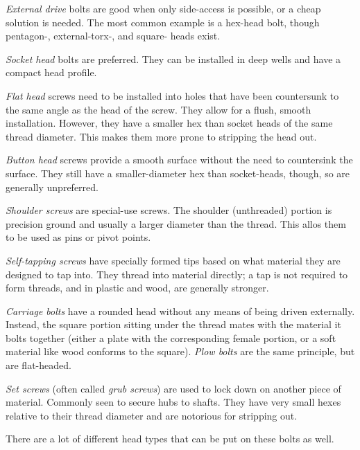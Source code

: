 \documentclass[10pt,letterpaper]{book}
\begin{document}
	\begin{asparaenum}[a)]
		\item \textit{External drive} bolts are good when only side-access is possible, or a cheap solution is needed. The most common example is a hex-head bolt, though pentagon-, external-torx-, and square- heads exist.
		\item \textit{Socket head} bolts are preferred. They can be installed in deep wells and have a compact head profile.
		\item \textit{Flat head} screws need to be installed into holes that have been countersunk to the same angle as the head of the screw. They allow for a flush, smooth installation. However, they have a smaller hex than socket heads of the same thread diameter. This makes them more prone to stripping the head out.
		\item \textit{Button head} screws provide a smooth surface without the need to countersink the surface. They still have a smaller-diameter hex than socket-heads, though, so are generally unpreferred.
		\item \textit{Shoulder screws} are special-use screws. The shoulder (unthreaded) portion is precision ground and usually a larger diameter than the thread. This allos them to be used as pins or pivot points.
		\item \textit{Self-tapping screws} have specially formed tips based on what material they are designed to tap into. They thread into material directly; a tap is not required to form threads, and in plastic and wood, are generally stronger.
		\item \textit{Carriage bolts} have a rounded head without any means of being driven externally. Instead, the square portion sitting under the thread mates with the material it bolts together (either a plate with the corresponding female portion, or a soft material like wood conforms to the square). \textit{Plow bolts} are the same principle, but are flat-headed.
		\item \textit{Set screws} (often called \textit{grub screws}) are used to lock down on another piece of material. Commonly seen to secure hubs to shafts. They have very small hexes relative to their thread diameter and are notorious for stripping out.
	\end{asparaenum}
	
	There are a lot of different head types that can be put on these bolts as well. 
	
\end{document}
